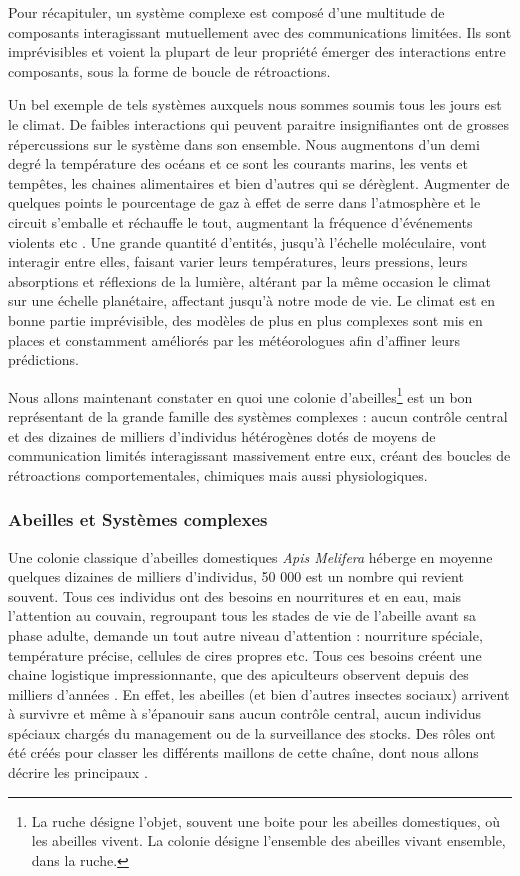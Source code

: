 			Pour récapituler, un système complexe est composé d'une multitude de composants interagissant mutuellement avec des communications limitées. Ils sont imprévisibles et voient la plupart de leur propriété émerger des interactions entre composants, sous la forme de boucle de rétroactions.
			
			Un bel exemple de tels systèmes auxquels nous sommes soumis tous les jours est le climat. De faibles interactions qui peuvent paraitre insignifiantes ont de grosses répercussions sur le système dans son ensemble. Nous augmentons d'un demi degré la température des océans et ce sont les courants marins, les vents et tempêtes, les chaines alimentaires et bien d'autres qui se dérèglent. Augmenter de quelques points le pourcentage de gaz à effet de serre dans l'atmosphère et le circuit s'emballe et réchauffe le tout, augmentant la fréquence d'événements violents etc \cite{allen_2018_2018}. Une grande quantité d'entités, jusqu'à l'échelle moléculaire, vont interagir entre elles, faisant varier leurs températures, leurs pressions, leurs absorptions et réflexions de la lumière, altérant par la même occasion le climat sur une échelle planétaire, affectant jusqu'à notre mode de vie. Le climat est en bonne partie imprévisible, des modèles de plus en plus complexes sont mis en places et constamment améliorés par les météorologues afin d'affiner leurs prédictions.
						
			Nous allons maintenant constater en quoi une colonie d'abeilles\footnote{La ruche désigne l'objet, souvent une boite pour les abeilles domestiques, où les abeilles vivent. La colonie désigne l'ensemble des abeilles vivant ensemble, dans la ruche.} est un bon représentant de la grande famille des systèmes complexes : aucun contrôle central et des dizaines de milliers d'individus hétérogènes dotés de moyens de communication limités interagissant massivement entre eux, créant des boucles de rétroactions comportementales, chimiques mais aussi physiologiques.
			
			

	
		\subsubsection{Abeilles et Systèmes complexes}	
		\label{sectionBio}	
			Une colonie classique d'abeilles domestiques \textit{Apis Melifera} héberge en moyenne quelques dizaines de milliers d'individus, 50 000 est un nombre qui revient souvent. Tous ces individus ont des besoins en nourritures et en eau, mais l'attention au couvain, regroupant tous les stades de vie de l'abeille avant sa phase adulte, demande un tout autre niveau d'attention : nourriture spéciale, température précise, cellules de cires propres etc. Tous ces besoins créent une chaine logistique impressionnante, que des apiculteurs observent depuis des milliers d'années \cite{oldroyd_domestication_2012}. En effet, les abeilles (et bien d'autres insectes sociaux) arrivent à survivre et même à s'épanouir sans aucun contrôle central, aucun individus spéciaux chargés du management ou de la surveillance des stocks. Des rôles ont été créés pour classer les différents maillons de cette chaîne, dont nous allons décrire les principaux \cite{winston_biology_1991, winston_role_1991, seeley_age_1991}. 
			
